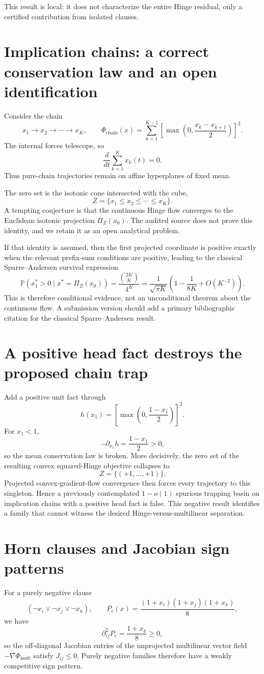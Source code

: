 \documentclass[11pt,a4paper]{article}
\begin{document}
This result is local: it does not characterize the entire Hinge residual, only a certified contribution from isolated clauses.

\section{Implication chains: a correct conservation law and an open identification}
Consider the chain
\[
x_1\to x_2\to\cdots\to x_K,
\qquad
\Phi_{\mathrm{chain}}(x)=\sum_{k=1}^{K-1}\left[\max\left(0,\frac{x_k-x_{k+1}}2\right)\right]^2.
\]
The internal forces telescope, so
\[
\frac{d}{dt}\sum_{k=1}^Kx_k(t)=0.
\]
Thus pure-chain trajectories remain on affine hyperplanes of fixed mean.

The zero set is the isotonic cone intersected with the cube,
\[
Z=\{x_1\le x_2\le\cdots\le x_K\}.
\]
A tempting conjecture is that the continuous Hinge flow converges to the Euclidean isotonic projection $\Pi_Z(x_0)$. The audited source does not prove this identity, and we retain it as an open analytical problem.

If that identity is assumed, then the first projected coordinate is positive exactly when the relevant prefix-sum conditions are positive, leading to the classical Sparre--Andersen survival expression
\[
\mathbb P(x_1^*>0\mid x^*=\Pi_Z(x_0))
=\frac{\binom{2K}{K}}{4^K}
=\frac1{\sqrt{\pi K}}\left(1-\frac1{8K}+O(K^{-2})\right).
\]
This is therefore conditional evidence, not an unconditional theorem about the continuous flow. A submission version should add a primary bibliographic citation for the classical Sparre--Andersen result.

\section{A positive head fact destroys the proposed chain trap}
Add a positive unit fact through
\[
h(x_1)=\left[\max\left(0,\frac{1-x_1}{2}\right)\right]^2.
\]
For $x_1<1$,
\[
-\partial_{x_1}h=\frac{1-x_1}{2}>0,
\]
so the mean conservation law is broken. More decisively, the zero set of the resulting convex squared-Hinge objective collapses to
\[
Z=\{(+1,\ldots,+1)\}.
\]
Projected convex-gradient-flow convergence then forces every trajectory to this singleton. Hence a previously contemplated $1-o(1)$ spurious trapping basin on implication chains with a positive head fact is false. This negative result identifies a family that cannot witness the desired Hinge-versus-multilinear separation.

\section{Horn clauses and Jacobian sign patterns}
For a purely negative clause
\[
(\neg x_i\lor\neg x_j\lor\neg x_k),
\qquad
P_c(x)=\frac{(1+x_i)(1+x_j)(1+x_k)}8,
\]
we have
\[
\partial_{ij}^2P_c=\frac{1+x_k}{8}\ge0,
\]
so the off-diagonal Jacobian entries of the unprojected multilinear vector field $-\nabla\Phi_{\mathrm{mult}}$ satisfy $J_{ij}\le0$. Purely negative families therefore have a weakly competitive sign pattern.
\end{document}
